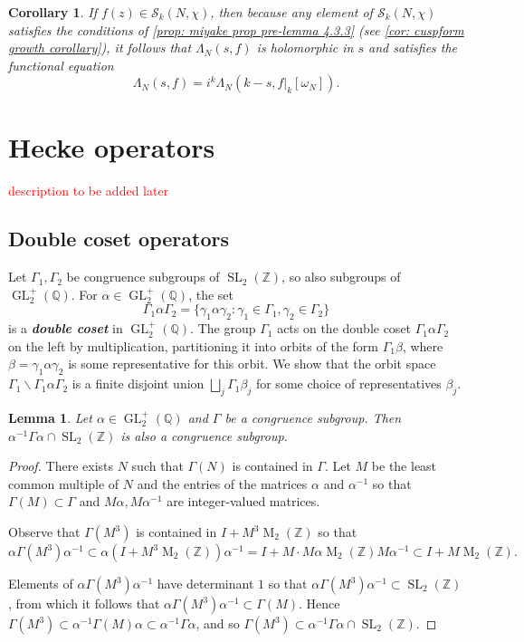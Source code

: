 \documentclass[10pt,leqno,twoside]{article}
\theoremstyle{plain}
\newtheorem{lemma}[lem]{Lemma}
\newtheorem{corollary}[lem]{Corollary}
\theoremstyle{definition}
\numberwithin{equation}{section}
\numberwithin{lem}{section}
\newcommand{\textib}[1]{\textbf{\textit{#1\index{#1}}}} %
\DeclareMathOperator{\Mat}{M}
\DeclareMathOperator{\GL}{GL}
\DeclareMathOperator{\SL}{SL}
\newcommand{\slz}{\SL_2(\mathbb{Z})}
\newcommand{\glqp}{\GL_2^+(\mathbb{Q})}
\newcommand{\sai}[1]{\textcolor{red}{#1}}
\begin{document}
\begin{corollary}\label{cor: miyake cor 4.3.7}
    If $f(z)\in \mathcal S_k(N,\chi)$, then because any element of $\mathcal S_k(N,\chi)$ satisfies the conditions of \cref{prop: miyake prop pre-lemma 4.3.3} \textup{(}see \cref{cor: cuspform growth corollary}\textup{)}, it follows that $\varLambda_N(s,f)$ is holomorphic in $s$ and satisfies the functional equation
    \[\varLambda_N(s,f) = i^k\varLambda_N(k-s,f|_k[\omega_N]).\]
\end{corollary}

\newpage\section{Hecke operators}
\sai{description to be added later}
\subsection{Double coset operators}
Let $\varGamma_1,\varGamma_2$ be congruence subgroups of $\slz$, so also subgroups of $\glqp$. For $\alpha\in\glqp$, the set
\[\varGamma_1\alpha\varGamma_2 = \{\gamma_1\alpha\gamma_2 : \gamma_1\in\varGamma_1, \gamma_2\in\varGamma_2\}\] is a \textib{double coset} in $\glqp$. The group $\varGamma_1$ acts on the double coset $\varGamma_1\alpha\varGamma_2$ on the left by multiplication, partitioning it into orbits of the form $\varGamma_1\beta$, where $\beta = \gamma_1\alpha\gamma_2$ is some representative for this orbit. We show that the orbit space  $\varGamma_1\backslash\varGamma_1\alpha\varGamma_2$ is a finite disjoint union $\bigsqcup_j\varGamma_1\beta_j$ for some choice of representatives $\beta_j$.
\begin{lemma}\label{lem: conjugation congruence subgroup}
    Let $\alpha\in\glqp$ and $\varGamma$ be a congruence subgroup. Then $\alpha^{-1}\varGamma\alpha\cap\slz$ is also a congruence subgroup.
\end{lemma}
\begin{proof}
    There exists $N$ such that $\varGamma(N)$ is contained in $\varGamma$. Let $M$ be the least common multiple of $N$ and the entries of the matrices $\alpha$ and $\alpha^{-1}$ so that $\varGamma(M)\subset \varGamma$ and $M\alpha, M\alpha^{-1}$ are integer-valued matrices.
    
    Observe that $\varGamma(M^3)$ is contained in $I + M^3\Mat_2(\mathbb Z)$ so that 
    \[\alpha\varGamma(M^3)\alpha^{-1}\subset \alpha(I + M^3\Mat_2(\mathbb Z))\alpha^{-1} = I + M\cdot M\alpha \Mat_2(\mathbb Z) M\alpha^{-1}\subset I+M\Mat_2(\mathbb{Z}).\]
    
    Elements of $\alpha\varGamma(M^3)\alpha^{-1}$ have determinant $1$ so that $\alpha\varGamma(M^3)\alpha^{-1}\subset \slz$, from which it follows that $\alpha\varGamma(M^3)\alpha^{-1}\subset \varGamma(M)$. Hence $\varGamma(M^3)\subset \alpha^{-1}\varGamma(M)\alpha \subset \alpha^{-1}\varGamma\alpha$, and so $\varGamma(M^3)\subset \alpha^{-1}\varGamma\alpha\cap \slz$.
\end{proof}
\end{document}
